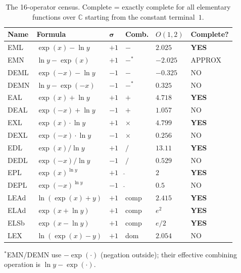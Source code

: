 \documentclass[12pt,a4paper]{article}
\theoremstyle{definition}
\begin{document}
\begin{table}[h]
\centering
\caption{The 16-operator census. Complete = exactly complete for all elementary
functions over $\mathbb{C}$ starting from the constant terminal~$1$.}
\label{tab:census}
\smallskip
\begin{tabular}{@{}llllll@{}}
\toprule
\textbf{Name} & \textbf{Formula} & $\boldsymbol{\sigma}$ & \textbf{Comb.}
  & \textbf{$O(1,2)$} & \textbf{Complete?} \\
\midrule
EML  & $\exp(x)-\ln y$       & $+1$ & $-$ & $2.025$  & \textbf{YES} \\
EMN  & $\ln y - \exp(x)$     & $+1$ & $-^*$ & $-2.025$ & APPROX \\
DEML & $\exp(-x)-\ln y$      & $-1$ & $-$ & $-0.325$ & NO \\
DEMN & $\ln y - \exp(-x)$    & $-1$ & $-^*$ & $0.325$  & NO \\
EAL  & $\exp(x)+\ln y$       & $+1$ & $+$ & $4.718$  & \textbf{YES} \\
DEAL & $\exp(-x)+\ln y$      & $-1$ & $+$ & $1.057$  & NO \\
EXL  & $\exp(x)\cdot\ln y$   & $+1$ & $\times$ & $4.799$ & \textbf{YES} \\
DEXL & $\exp(-x)\cdot\ln y$  & $-1$ & $\times$ & $0.256$ & NO \\
EDL  & $\exp(x)/\ln y$       & $+1$ & $/$ & $13.11$ & \textbf{YES} \\
DEDL & $\exp(-x)/\ln y$      & $-1$ & $/$ & $0.529$ & NO \\
EPL  & $\exp(x)^{\ln y}$     & $+1$ & $\hat{}$ & $2$ & \textbf{YES} \\
DEPL & $\exp(-x)^{\ln y}$    & $-1$ & $\hat{}$ & $0.5$ & NO \\
LEAd & $\ln(\exp(x)+y)$      & $+1$ & comp & $2.415$ & \textbf{YES} \\
ELAd & $\exp(x+\ln y)$       & $+1$ & comp & $e^2$ & \textbf{YES} \\
ELSb & $\exp(x-\ln y)$       & $+1$ & comp & $e/2$ & \textbf{YES} \\
LEX  & $\ln(\exp(x)-y)$      & $+1$ & dom & $2.054$ & NO \\
\bottomrule
\end{tabular}

\smallskip
\footnotesize{$^*$EMN/DEMN use $-\exp(\cdot)$ (negation outside); their
effective combining operation is $\ln y - \exp(\cdot)$.}
\end{table}

\end{document}
